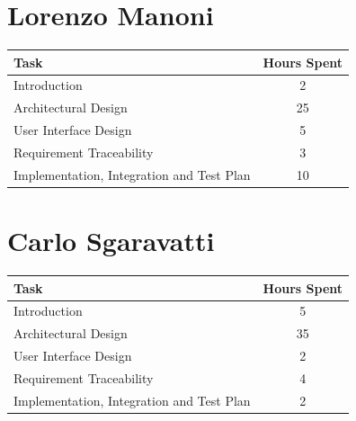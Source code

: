 \documentclass{Configuration_Files/PoliMi3i_thesis}
\begin{document}
\section{Lorenzo Manoni}

\begin{table}[H]
    \centering 
    \begin{tabular}{|l|c|}
    \hline
    \rowcolor{bluepoli!40}
    \textbf{Task} & \textbf{Hours Spent} \T\B \\
    \hline
    Introduction & 2\T\B \\
    \hline
    Architectural Design & 25\T\B \\
    \hline
    User Interface Design & 5\T\B \\
    \hline
    Requirement Traceability & 3\T\B \\
    \hline
    Implementation, Integration and Test Plan & 10\T\B \\
    \hline
    \end{tabular}
\end{table}

\section{Carlo Sgaravatti}

\begin{table}[H]
    \centering 
    \begin{tabular}{|l|c|}
    \hline
    \rowcolor{bluepoli!40}
    \textbf{Task} & \textbf{Hours Spent} \T\B \\
    \hline
    Introduction & 5\T\B \\
    \hline
    Architectural Design & 35\T\B \\
    \hline
    User Interface Design & 2\T\B \\
    \hline
    Requirement Traceability & 4\T\B \\
    \hline
    Implementation, Integration and Test Plan & 2\T\B \\
    \hline
    \end{tabular}
\end{table}

\cleardoublepage
\end{document}
